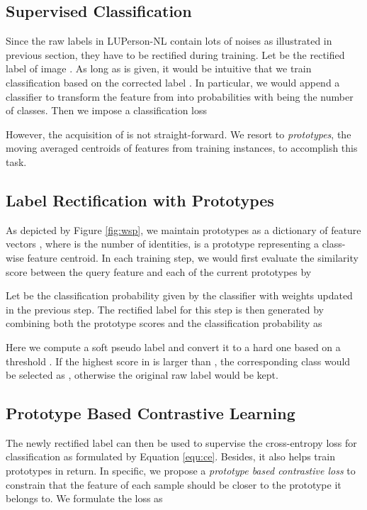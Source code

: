 \documentclass[10pt,twocolumn,letterpaper]{article}
\begin{document}
\subsection{Supervised Classification}


Since the raw labels  in LUPerson-NL contain lots of noises as illustrated in previous section, they have to be rectified during training.
Let  be the rectified label of image . As long as  is given, it would be intuitive that we train classification based on the corrected label . 
In particular, we would append a classifier to transform the feature from  into probabilities  with  being the number of classes. Then we impose a classification loss




However, the acquisition of  is not straight-forward. 
We resort to \emph{prototypes}, the moving averaged centroids of features from training instances, to accomplish this task.

\subsection{Label Rectification with Prototypes}
\label{ssec:label_rectification}


As depicted by Figure \ref{fig:wsp}, we maintain prototypes as a dictionary of feature vectors , where  is the number of identities,  is a prototype representing a class-wise feature centroid.
In each training step, we would first evaluate the similarity score  between the query feature  and each of the current prototypes  by 




Let  be the classification probability given by the classifier with weights updated in the previous step.
The rectified label  for this step is then generated by combining both the prototype scores  and the classification probability  as




Here we compute a soft pseudo label  and convert it to a hard one  based on a threshold . 
If the highest score in  is larger than , the corresponding class would be selected as , otherwise the original raw label  would be kept.

\subsection{Prototype Based Contrastive Learning}
\label{ssec:prototypes}


The newly rectified label  can then be used to supervise the cross-entropy loss  for classification as formulated by Equation \ref{equ:ce}.
Besides, it also helps train prototypes  in return.
In specific, we propose a \emph{prototype based contrastive loss}  to constrain that the feature of each sample should be closer to the prototype it belongs to.
We formulate the loss as
\end{document}
